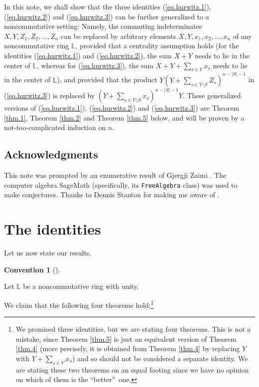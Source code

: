 \documentclass[numbers=enddot,12pt,final,onecolumn,notitlepage]{scrartcl}%
\theoremstyle{definition}
\newtheorem{conv}[theo]{Convention}
\newenvironment{convention}[1][]
{\begin{conv}[#1]\begin{leftbar}}
{\end{leftbar}\end{conv}}
\newenvironment{convention}[1][Convention]{\noindent\textbf{#1.} }{\ \rule{0.5em}{0.5em}}
\let\sumnonlimits\sum
\renewcommand{\sum}{\sumnonlimits\limits}
\begin{document}
In this note, we shall show that the three identities (\ref{eq.hurwitz.1}),
(\ref{eq.hurwitz.2}) and (\ref{eq.hurwitz.3}) can be further generalized to a
noncommutative setting: Namely, the commuting indeterminates $X,Y,Z_{1}%
,Z_{2},\ldots,Z_{n}$ can be replaced by arbitrary elements $X,Y,x_{1}%
,x_{2},\ldots,x_{n}$ of any noncommutative ring $\mathbb{L}$, provided that a
centrality assumption holds (for the identities (\ref{eq.hurwitz.1}) and
(\ref{eq.hurwitz.2}), the sum $X+Y$ needs to lie in the center of $\mathbb{L}%
$, whereas for (\ref{eq.hurwitz.3}), the sum $X+Y+\sum_{s\in V}x_{s}$ needs to
lie in the center of $\mathbb{L}$), and provided that the product $Y\left(
Y+\sum_{s\in V\setminus S}Z_{s}\right)  ^{n-\left\vert S\right\vert -1}$ in
(\ref{eq.hurwitz.3}) is replaced by $\left(  Y+\sum_{s\in V\setminus S}%
x_{s}\right)  ^{n-\left\vert S\right\vert -1}Y$. These generalized versions of
(\ref{eq.hurwitz.1}), (\ref{eq.hurwitz.2}) and (\ref{eq.hurwitz.3}) are
Theorem \ref{thm.1}, Theorem \ref{thm.2} and Theorem \ref{thm.5} below, and
will be proven by a not-too-complicated induction on $n$.

\subsection*{Acknowledgments}

This note was prompted by an enumerative result of Gjergji Zaimi
\cite{Zaimi17}. The computer algebra SageMath \cite{SageMath} (specifically,
its \texttt{FreeAlgebra} class) was used to make conjectures. Thanks to Dennis
Stanton for making me aware of \cite{Johns96}.

\section{The identities}

Let us now state our results.

\begin{convention}
Let $\mathbb{L}$ be a noncommutative ring with unity.
\end{convention}

We claim that the following four theorems hold:\footnote{We promised three
identities, but we are stating four theorems. This is not a mistake, since
Theorem \ref{thm.5} is just an equivalent version of Theorem \ref{thm.4} (more
precisely, it is obtained from Theorem \ref{thm.4} by replacing $Y$ with
$Y+\sum_{s\in V}x_{s}$) and so should not be considered a separate identity.
We are stating these two theorems on an equal footing since we have no opinion
on which of them is the \textquotedblleft better\textquotedblright\ one.}
\end{document}
